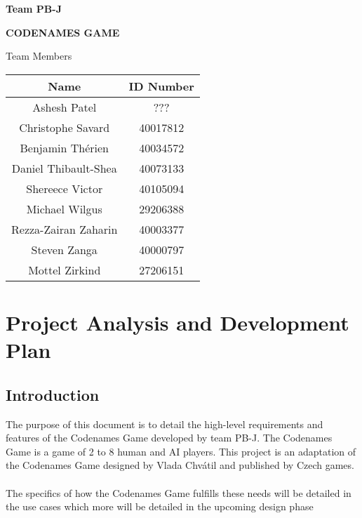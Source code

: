 \documentclass[12pt, a4paper]{article}
\begin{document}
		
\hrulefill
\begin{flushright}
\textbf{Team PB-J}
\end{flushright}
\hrulefill

\vspace*{0.5in}
\centerline{\bf\Large CODENAMES GAME}

\vspace*{1.5in}
\begin{table}[htbp]
\begin{center}
	Team Members\\
\end{center}
\begin{center}
	\begin{tabular}{| c | c |}
	\hline
	Name & ID Number \\
	\hline\hline
	Ashesh Patel & ??? \\
	Christophe Savard & 40017812\\
	Benjamin Th\'erien & 40034572\\
	Daniel Thibault-Shea & 40073133\\
	Shereece Victor & 40105094\\
	Michael Wilgus & 29206388 \\
	Rezza-Zairan Zaharin & 40003377 \\
	Steven Zanga & 40000797\\
	Mottel Zirkind & 27206151\\
	\hline
	\end{tabular}
\end{center}
\end{table}

\newpage
\newpage


\section{Project Analysis and Development Plan}

	\subsection{Introduction}
	
	 The purpose of this document is to detail the high-level requirements and features of the Codenames Game developed by team PB-J. The Codenames Game is a game of 2 to 8 human and AI players. This project is an adaptation of the Codenames Game designed by Vlada Chv\'atil and published by Czech games.\\
	 \\
	 The specifics of how the Codenames Game fulfills these needs will be detailed in the use cases which more will be detailed in the upcoming design phase\\
	
\end{document}
